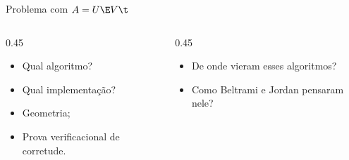 
\begin{frame}{Problema com $A = U \E V\t$}
  \begin{columns}[t]

    \begin{column}{0.45\textwidth}
      \begin{itemize}
        \item Qual algoritmo?\\[0.75cm]
        \item Qual implementação?\\[0.75cm]
        \item Geometria;\\[0.75cm]
        \item Prova verificacional de corretude.
      \end{itemize}
    \end{column}

    \begin{column}{0.45\textwidth}
      \vspace{0.5cm}
      \begin{itemize}
        \item De onde vieram esses algoritmos? \\[1.25cm]

        \item Como Beltrami e Jordan pensaram nele?
      \end{itemize}
    \end{column}
  \end{columns}
\end{frame}
